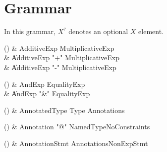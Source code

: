 \chapter{Grammar}\label{Grammar}


In this grammar, $X^?$ denotes an optional $X$ element.


\begin{bbgrammarappendix}

() & AdditiveExp \label{prod:AdditiveExp}  \: MultiplicativeExp  \\

 &    \| AdditiveExp \xcd"+" MultiplicativeExp \\
 &    \| AdditiveExp \xcd"-" MultiplicativeExp \\

\end{bbgrammarappendix}

\begin{bbgrammarappendix}

() & AndExp \label{prod:AndExp}  \: EqualityExp  \\

 &    \| AndExp \xcd"&" EqualityExp \\

\end{bbgrammarappendix}

\begin{bbgrammarappendix}

() & AnnotatedType \label{prod:AnnotatedType}  \: Type Annotations  \\


\end{bbgrammarappendix}

\begin{bbgrammarappendix}

() & Annotation \label{prod:Annotation}  \: \xcd"@" NamedTypeNoConstraints  \\


\end{bbgrammarappendix}

\begin{bbgrammarappendix}

() & AnnotationStmt \label{prod:AnnotationStmt}  \: Annotations\opt NonExpStmt  \\


\end{bbgrammarappendix}

